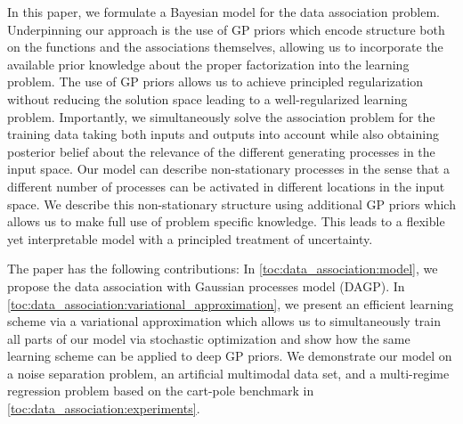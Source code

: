 In this paper, we formulate a Bayesian model for the data association problem.
Underpinning our approach is the use of GP priors which encode structure both on the functions and the associations themselves, allowing us to incorporate the available prior knowledge about the proper factorization into the learning problem.
The use of GP priors allows us to achieve principled regularization without reducing the solution space leading to a well-regularized learning problem.
Importantly, we simultaneously solve the association problem for the training data taking both inputs and outputs into account while also obtaining posterior belief about the relevance of the different generating processes in the input space.
Our model can describe non-stationary processes in the sense that a different number of processes can be activated in different locations in the input space.
We describe this non-stationary structure using additional GP priors which allows us to make full use of problem specific knowledge.
This leads to a flexible yet interpretable model with a principled treatment of uncertainty.

The paper has the following contributions:
In \cref{toc:data_association:model}, we propose the data association with Gaussian processes model (DAGP).
In \cref{toc:data_association:variational_approximation}, we present an efficient learning scheme via a variational approximation which allows us to simultaneously train all parts of our model via stochastic optimization and show how the same learning scheme can be applied to deep GP priors.
We demonstrate our model on a noise separation problem, an artificial multimodal data set, and a multi-regime regression problem based on the cart-pole benchmark in \cref{toc:data_association:experiments}.


